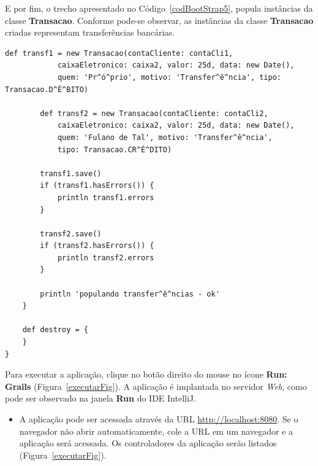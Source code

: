 \newpage

E por fim, o trecho apresentado no Código~\ref{codBootStrap5}, popula instâncias
da classe  {\bf Transacao}. Conforme  pode-se observar, as instâncias  da classe
{\bf Transacao} criadas representam transferências bancárias.

\begin{lstlisting}[caption={\bf BootStrap.groovy (5)}, frame = trBL, float=htbp,
    label=codBootStrap5] 
        def transf1 = new Transacao(contaCliente: contaCli1, 
            caixaEletronico: caixa2, valor: 25d, data: new Date(),
            quem: 'Pr^ó^prio', motivo: 'Transfer^ê^ncia', tipo: Transacao.D^É^BITO)
        
        def transf2 = new Transacao(contaCliente: contaCli2, 
            caixaEletronico: caixa2, valor: 25d, data: new Date(),
            quem: 'Fulano de Tal', motivo: 'Transfer^ê^ncia', 
            tipo: Transacao.CR^É^DITO)
        
        transf1.save()
        if (transf1.hasErrors()) {
            println transf1.errors
        }
        
        transf2.save()
        if (transf2.hasErrors()) {
            println transf2.errors
        }
        
        println 'populando transfer^ê^ncias - ok'
    }

    def destroy = {
    }
}
\end{lstlisting}

\vspace{0.3cm}

Para executar a  aplicação, clique no botão direito do mouse  no ícone {\bf Run:
  Grails} (Figura~\ref{executarFig}).  A aplicação é implantada no servidor {\it
  Web},   como   pode    ser   observado   na   janela   {\bf    Run}   do   IDE
IntelliJ.  
\vspace{0.3cm}

\begin{itemize}

\item     A     aplicação    pode     ser     acessada     através    da     URL
  {\footnotesize\url{http://localhost:8080}}.    Se   o   navegador  não   abrir
  automaticamente, cole a  URL em um navegador e a  aplicação será acessada.  Os
  controladores da aplicação serão listados (Figura~\ref{executarFig}).  
\end{itemize}

\vspace{0.2cm}

